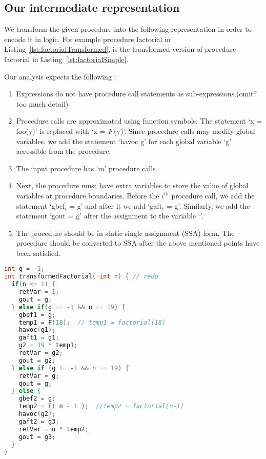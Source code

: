\subsection{Our intermediate representation}
\label{sec:intermediate}
We transform the given procedure into the following representation
in-order to encode it in logic. For example procedure factorial
in Listing~\ref{lst:factorialTransformed}, is the transformed version
of procedure factorial in Listing~\ref{lst:factorialSimple}.

Our analysis expects the following :
\begin{enumerate}
\item Expressions do not have procedure call statements as
  sub-expressions.(omit? too much detail)
\item Procedure calls are approximated using function symbols. The
  statement `x = foo(y)' is replaced with `x = $\mathit{F}$(y)'. Since
  procedure calls may modify global variables, we add the statement
  `havoc g' for each global variable `g' accessible from the
  procedure.
\item The input procedure has `m' procedure calls.
\item Next, the procedure must have extra variables to store the value
  of global variables at procedure boundaries. Before the
  $\mathit{i^{th}}$ procedure call, we add the statement `gbef$_i$ =
  g' and after it we add `gaft$_i$ = g'. Similarly, we add the
  statement `gout = g' after the assignment to the variable `\retVar'.
\item The procedure should be in static single assignment (SSA)
  form. The procedure should be converted to SSA after the above
  mentioned points have been satisfied.
\end{enumerate}

\begin{lstlisting}[language=c, caption= {Procedure factorial from
      Listing~\ref{lst:factorialSimple} converted to the form our
      approach expects. We refer to this procedure as `transformed
      factorial'.}, label=lst:factorialTransformed]
int g = -1;
int transformedFactorial( int n) { // redo
  if(n <= 1) {
    retVar = 1;
    gout = g;
  } else if(g == -1 && n == 19) {
    gbef1 = g;
    temp1 = F(18);  // temp1 = factorial(18)
    havoc(g1);
    gaft1 = g1;
    g2 = 19 * temp1;
    retVar = g2;
    gout = g2;
  } else if (g != -1 && n == 19) {
    retVar = g;
    gout = g;
  } else {
    gbef2 = g;
    temp2 = F( n - 1 );  //temp2 = factorial(n-1)
    havoc(g2);
    gaft2 = g3;
    retVar = n * temp2;
    gout = g3;
  }
}
\end{lstlisting}

